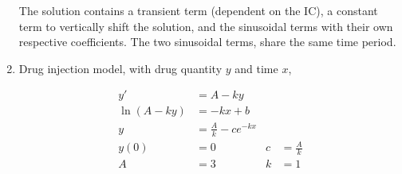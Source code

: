 \begin{enumerate}
          The solution contains a transient term (dependent on the IC), a constant term to vertically shift the
          solution, and the sinusoidal terms with their own respective coefficients. The two sinusoidal terms,
          share the same time period.
          \begin{figure}[H]
              \centering
          \end{figure}

    \item Drug injection model, with drug quantity $ y $ and time $ x $,

          \begin{align}
              y'           & = A - ky                                     \\
              \ln (A - ky) & = -kx + b                                    \\
              y            & = \frac{A}{k} - ce^{-kx}                     \\
              y(0)         & = 0                      & c & = \frac{A}{k} \\
              A            & = 3                      & k & = 1
          \end{align}


\end{enumerate}
